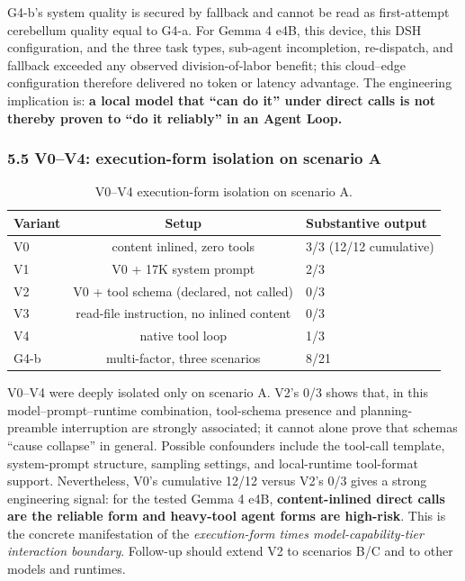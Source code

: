 \documentclass[
]{article}
\begin{document}
G4-b's system quality is secured by fallback and cannot be read as first-attempt cerebellum quality equal to G4-a. For Gemma 4 e4B, this device, this DSH configuration, and the three task types, sub-agent incompletion, re-dispatch, and fallback exceeded any observed division-of-labor benefit; this cloud--edge configuration therefore delivered no token or latency advantage. The engineering implication is: \textbf{a local model that ``can do it'' under direct calls is not thereby proven to ``do it reliably'' in an Agent Loop.}

\subsubsection{5.5 V0--V4: execution-form isolation on scenario A}
\begin{table}[ht]
\centering
\small
\begin{tabular}{lcl}
\toprule
Variant & Setup & Substantive output \\
\midrule
V0 & content inlined, zero tools & 3/3 (12/12 cumulative) \\
V1 & V0 + 17K system prompt & 2/3 \\
V2 & V0 + tool schema (declared, not called) & 0/3 \\
V3 & read-file instruction, no inlined content & 0/3 \\
V4 & native tool loop & 1/3 \\
G4-b & multi-factor, three scenarios & 8/21 \\
\bottomrule
\end{tabular}
\caption{V0--V4 execution-form isolation on scenario A.}
\label{tab:v}
\end{table}

V0--V4 were deeply isolated only on scenario A. V2's 0/3 shows that, in this model--prompt--runtime combination, tool-schema presence and planning-preamble interruption are strongly associated; it cannot alone prove that schemas ``cause collapse'' in general. Possible confounders include the tool-call template, system-prompt structure, sampling settings, and local-runtime tool-format support. Nevertheless, V0's cumulative 12/12 versus V2's 0/3 gives a strong engineering signal: for the tested Gemma 4 e4B, \textbf{content-inlined direct calls are the reliable form and heavy-tool agent forms are high-risk}. This is the concrete manifestation of the \emph{execution-form times model-capability-tier interaction boundary}. Follow-up should extend V2 to scenarios B/C and to other models and runtimes.
\end{document}
